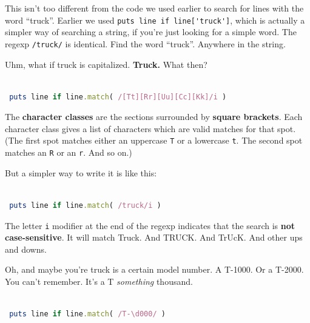 \documentclass[10pt,twoside]{report}
\begin{document}
This isn't too different from the code we used earlier to search for
lines with the word ``truck''.  Earlier we used
\lstinline[breaklines=true]|puts line if line['truck']|, which is
actually a simpler way of searching a string, if you're just looking
for a simple word.  The regexp \lstinline[breaklines=true]|/truck/| is
identical.  Find the word ``truck''.  Anywhere in the string.

Uhm, what if truck is capitalized.  {\bf Truck.}  What then?


\begin{lstlisting}[basicstyle=\ttfamily\color{basiccolor},
    commentstyle = \ttfamily\color{commentcolor},
    keywordstyle=\ttfamily\color{keywordscolor},
    stringstyle=\color{stringcolor},
    language=Ruby,
    basicstyle=\small\ttfamily,
    showstringspaces=false,
  ]

 puts line if line.match( /[Tt][Rr][Uu][Cc][Kk]/i )

\end{lstlisting}


The {\bf character classes} are the sections surrounded by {\bf square
  brackets}.  Each character class gives a list of characters which
are valid matches for that spot.  (The first spot matches either an
uppercase \lstinline[breaklines=true]|T| or a lowercase
\lstinline[breaklines=true]|t|.  The second spot matches an
\lstinline[breaklines=true]|R| or an \lstinline[breaklines=true]|r|.
And so on.)

But a simpler way to write it is like this:


\begin{lstlisting}[basicstyle=\ttfamily\color{basiccolor},
    commentstyle = \ttfamily\color{commentcolor},
    keywordstyle=\ttfamily\color{keywordscolor},
    stringstyle=\color{stringcolor},
    language=Ruby,
    basicstyle=\small\ttfamily,
    showstringspaces=false,
  ]

 puts line if line.match( /truck/i )

\end{lstlisting}


The letter \lstinline[breaklines=true]|i| modifier at the end of the
regexp indicates that the search is {\bf not case-sensitive}.  It will
match Truck.  And TRUCK.  And TrUcK.  And other ups and downs.

Oh, and maybe you're truck is a certain model number.  A T-1000.  Or a
T-2000.  You can't remember.  It's a T {\em something} thousand.


\begin{lstlisting}[basicstyle=\ttfamily\color{basiccolor},
    commentstyle = \ttfamily\color{commentcolor},
    keywordstyle=\ttfamily\color{keywordscolor},
    stringstyle=\color{stringcolor},
    language=Ruby,
    basicstyle=\small\ttfamily,
    showstringspaces=false,
  ]

 puts line if line.match( /T-\d000/ )

\end{lstlisting}
\end{document}
